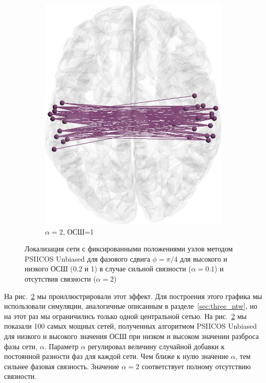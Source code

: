 \begin{figure}[htbp]
\begin{subfigure}[t]{0.24\textwidth}
        \includegraphics[width=0.99\linewidth]{../images/loreta_brain_jitter_2_snr_1_phase_lag_07854.jpg}
        \caption{$\alpha=2$, ОСШ=1}\label{fig:unbiased_1_ntw_d}
    \end{subfigure}
    \caption{Локализация сети с фиксированными положениями узлов методом PSIICOS Unbiased для 
    фазового сдвига $\phi=\pi/4$ для высокого и низкого ОСШ (0.2 и 1) в
    случае сильной связности ($\alpha=0.1$) и отсутствия связности ($\alpha=2$)}\label{fig:unbiased_breaks_in_high_snr}
\end{figure}

На рис.~\ref{fig:unbiased_breaks_in_high_snr} мы проиллюстрировали этот эффект.
Для построения этого графика мы использовали симуляции, аналогичные описанным в
разделе~\ref{sec:three_ntw}, но на этот раз мы ограничились только одной
центральной сетью. На рис.~\ref{fig:unbiased_breaks_in_high_snr} мы показали
100 самых мощных сетей, полученных алгоритмом PSIICOS Unbiased для низкого и
высокого значения ОСШ при низком и высоком значении разброса фазы сети, $\alpha$.
Параметр $\alpha$ регулировал величину случайной добавки к постоянной
разности фаз для каждой сети. Чем ближе к нулю значение $\alpha$, тем сильнее
фазовая связность. Значение $\alpha=2$ соответствует полному отсутствию связности.

